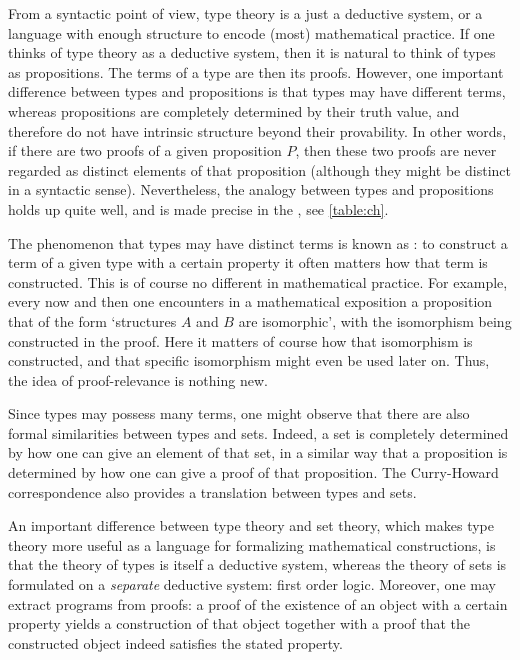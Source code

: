 From a syntactic point of view, type theory is a just a deductive system, or a language with enough structure to encode (most) mathematical practice. If one thinks of type theory as a deductive system, then it is natural to think of types as propositions. The terms of a type are then its proofs. However, one important difference between types and propositions is that types may have different terms, whereas propositions are completely determined by their truth value, and therefore do not have intrinsic structure beyond their provability. In other words, if there are two proofs of a given proposition $P$, then these two proofs are never regarded as distinct elements of that proposition (although they might be distinct in a syntactic sense). Nevertheless, the analogy between types and propositions holds up quite well, and is made precise in the , see \cref{table:ch}.

The phenomenon that types may have distinct terms is known as : to construct a term of a given type with a certain property it often matters how that term is constructed. This is of course no different in mathematical practice. For example, every now and then one encounters in a mathematical exposition a proposition that of the form `structures $A$ and $B$ are isomorphic', with the isomorphism being constructed in the proof. Here it matters of course how that isomorphism is constructed, and that specific isomorphism might even be used later on. Thus, the idea of proof-relevance is nothing new.

Since types may possess many terms, one might observe that there are also formal similarities between types and sets. Indeed, a set is completely determined by how one can give an element of that set, in a similar way that a proposition is determined by how one can give a proof of that proposition. The Curry-Howard correspondence also provides a translation between types and sets.

An important difference between type theory and set theory, which makes type theory more useful as a language for formalizing mathematical constructions, is that the theory of types is itself a deductive system, whereas the theory of sets is formulated on a \emph{separate} deductive system: first order logic. Moreover, one may extract programs from proofs: a proof of the existence of an object with a certain property yields a construction of that object together with a proof that the constructed object indeed satisfies the stated property.

